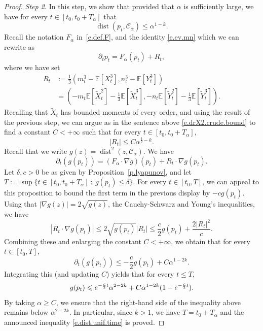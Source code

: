 \documentclass[11pt]{amsart}
\theoremstyle{remark}
\theoremstyle{definition}
\numberwithin{equation}{section}
\numberwithin{proposition}{section}
\renewcommand{\le}{\leqslant}
\renewcommand{\ge}{\geqslant}
\newcommand{\td}{\widetilde}
\newcommand{\Ll}{\left}
\newcommand{\Rr}{\right}
\newcommand{\dr}{\partial}
\newcommand{\1}{\mathbf{1}}
\newcommand{\msc}{\mathscr}
\newcommand{\al}{\alpha}
\newcommand{\de}{\delta}
\DeclareMathOperator{\dist}{dist}
\newcommand{\E}{\mathbb E}
\begin{document}
\begin{proof}
\noindent \emph{Step 2.} In this step, we show that provided that $\alpha$ is sufficiently large, we have for every $t \in [t_0, t_0 + T_\al]$ that 
\begin{equation}  
\label{e.dist.unif.time}
\dist(p_t, \msc C_\al) \le \al^{1-k}.
\end{equation}
Recall the notation $F_\al$ in~\eqref{e.def.F}, and the identity \eqref{e.ev.mn} which we can rewrite as
\begin{equation}  
\label{e.evol.p.R}
\dr_t p_t = F_\al(p_t) + R_t, 
\end{equation}
where we have set
\begin{align*}  %
R_t & := \frac 1 3 (m_t^3 - \E[X_t^3], n_t^3 - \E[Y_t^3]) 
\\
& =  \Ll(-m_t \E[\td X_t^2] -\frac 1 3 \E[\td X_t^3], -n_t \E[\td Y_t^2] - \frac 1 3 \E[\td Y_t^3]\Rr).
\end{align*}
Recalling that $\td X_t$ has bounded moments of every order, and using the result of the previous step, we can argue as in the sentence above \eqref{e.drX2.crude.bound} to find a constant $C < +\infty$ such that for every $t \in [t_0, t_0 + T_\al]$,
\begin{equation}  
\label{e.bound.R}
|R_t| \le C \al^{\frac 1 2 - k}.
\end{equation}
Recall that we write $g(z) = \dist^2(z, \msc C_\al)$. We have
\begin{equation*}  %
\dr_t (g(p_t)) = (F_\al \cdot \nabla g)(p_t) + R_t \cdot \nabla g(p_t). 
\end{equation*}
Let $\delta, c > 0$ be as given by Proposition~\ref{p.lyapunov}, and let $T := \sup \{ t \in [t_0, t_0 + T_\al] \ : \ g(p_t) \le \de\}$. For every $t \in [t_0, T]$, we can appeal to this proposition to bound the first term in the previous display by $-c g(p_t)$. 
Using that $|\nabla g(z)| = 2  \sqrt{g(z)}$, the Cauchy-Schwarz and Young's inequalities, we have
\begin{equation*}  %
|R_t \cdot \nabla g(p_t)| \le 2 \sqrt{g(p_t)} |R_t| \le \frac{c}{2} g(p_t) + \frac {2|R_t|^2}{c}.
\end{equation*}
Combining these and enlarging the constant $C < +\infty$, we obtain that for every $t \in [t_0, T]$,
\begin{equation*}  %
\dr_t (g(p_t)) \le -\frac c 2 g(p_t) + C \al^{1-2k}.
\end{equation*}
Integrating this (and updating $C$) yields that for every $t \le T$, 
\begin{equation}
\notag
g(p_t)  \le e^{-\frac{c}{2}t} \al^{2-2k} + C \al^{1-2k} (1 - e^{-\frac c 2 t}).
\end{equation}
By taking $\al \ge C$, we ensure that the right-hand side of the inequality above remains below $\al^{2-2k}$. In particular, since $k > 1$, we have $T = t_0 + T_\al$ and the announced inequality \eqref{e.dist.unif.time} is proved.


\end{proof}
\end{document}
